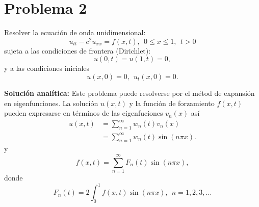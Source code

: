 \documentclass[11pt]{article}
\begin{document}


\clearpage
\section*{Problema 2}
Resolver la ecuaci\'on de onda unidimensional:
\begin{equation}
  \label{eq:onda_nh}
  u_{tt} - c^2 u_{xx} = f(x,t),~~0 \le x \le 1,~~t>0
\end{equation}
sujeta a las condiciones de frontera (Dirichlet):
\begin{equation}
  \label{eq:dirich}
  u(0,t) = u(1,t) = 0,
\end{equation}
y a las condiciones iniciales
\begin{equation}
  \label{eq:6}
  u(x,0) = 0,~~u_t(x,0)=0.
\end{equation}

{\bf Soluci\'on anal\'itica:} Este problema puede resolverse por el m\'etod de expansi\'on en eigenfunciones. La soluci\'on $u(x,t)$ y la funci\'on de forzamiento $f(x,t)$ pueden expresarse en t\'erminos de las eigenfuciones $v_n(x)$ as\'i
\begin{align}
  \label{eq:uxt}
u(x,t) &= \displaystyle\sum_{n=1}^\infty w_n(t)v_n(x) \\
       &= \displaystyle\sum_{n=1}^\infty w_n(t)\sin(n\pi x). 
\end{align}
y
\begin{equation}
  \label{eq:fxt}
  f(x,t) = \sum_{n=1}^\infty F_n(t)\sin(n\pi x),
\end{equation}
donde
\begin{equation}
  \label{eq:16}
  F_n(t) = 2 \int_0^1 f(x,t)\sin(n\pi x),~~n=1,2,3,...
\end{equation}
\end{document}
